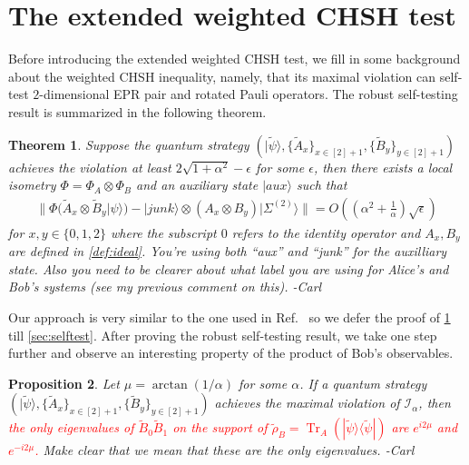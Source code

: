 \documentclass[11pt,letterpaper]{article}
\newcommand{\ket}[1]{|#1\rangle}
\newcommand{\ketbra}[2]{|#1\rangle\langle#2|}
\newcommand{\x}{\otimes}
\DeclareMathOperator{\Tr}{Tr}
\newcommand{\1}{\mathbb{1}}
\newcommand{\EPR}[1]{\Sigma^{(#1)}}
\newcommand{\tpsi}{\tilde{\psi}}
\newcommand{\I}{\mathcal{I}}
\def\carl#1{{\color{blue} #1 -Carl}}
\newcommand{\hf}[1]{\textcolor{red}{#1}}
\newtheorem{theorem}{Theorem}
\newtheorem{proposition}[theorem]{Proposition}
\theoremstyle{definition}
\begin{document}
\section{The extended weighted CHSH test}
\label{sec:chsh}
Before introducing the extended weighted CHSH test, we fill in some background about the weighted CHSH inequality,
namely, that its maximal violation can self-test $2$-dimensional EPR pair and rotated Pauli operators.
The robust self-testing result is summarized in the following theorem.
\begin{theorem}
\label{thm:selftest}
	Suppose the quantum strategy $(\ket{\tpsi}, \{\tilde{A}_x\}_{x \in [2]+1}, \{\tilde{B}_y\}_{y \in [2]+1})$ achieves the violation
	at least $2\sqrt{1+\alpha^2} - \epsilon$
	for some $\epsilon$, then
	there exists a local isometry $\Phi = \Phi_A \x \Phi_B$ and an auxiliary state $\ket{aux}$  such that
	\begin{align}
		\| \Phi( \tilde{A}_x \x \tilde{B}_y \ket{\psi}) -\ket{junk} \x (A_x \x B_y) \ket{\EPR{2}}  \| = O((\alpha^2+\frac{1}{\alpha}) \sqrt{\epsilon})
	\end{align}
	for $x,y \in \{0, 1, 2\}$ where the subscript $0$ refers to the identity operator and $A_x, B_y$ are 
	defined in \cref{def:ideal}.  \carl{You're using both ``aux'' and ``junk'' for the auxilliary state.  Also you need
	to be clearer about what label you are using for Alice's and Bob's systems (see my previous comment on this).}
\end{theorem}
Our approach is very similar to the one used in Ref.~\cite{bamps2015} so we 
defer the proof of \cref{thm:selftest} till \cref{sec:selftest}.
After proving the robust self-testing result, we take one step further and observe an interesting property of the 
product of Bob's observables.
\begin{proposition}
\label{prop:2d-subspace}
	Let $\mu = \arctan(1/\alpha)$ for some $\alpha$.
	If a quantum strategy $(\ket{\tpsi}, \{\tilde{A}_x\}_{x \in [2]+1}, \{\tilde{B}_y\}_{y \in [2]+1})$ achieves the maximal 
	violation of  $\I_{\alpha}$, then \hf{the only eigenvalues of $\tilde{B}_0\tilde{B}_1$ on the support of 
	$\tilde{\rho}_B = \Tr_A(\ketbra{\tpsi}{\tpsi})$
	are $e^{i2\mu}$ and $e^{-i2\mu}$.}  \carl{Make clear
	that we mean that these are the only eigenvalues.}
\end{proposition}
\end{document}
